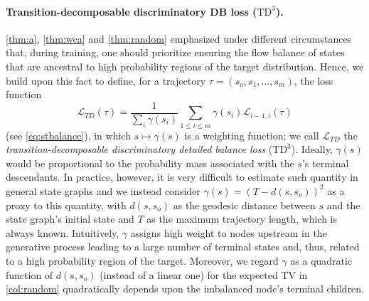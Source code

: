 \documentclass{article}
\theoremstyle{plain}
\theoremstyle{definition}
\theoremstyle{remark}
\theoremstyle{remark}
\begin{document}
\paragraph{Transition-decomposable discriminatory DB loss ($\text{TD}^{3}$).} \autoref{thm:a}, \autoref{thm:wca} and \autoref{thm:random} emphasized under different circumstances that, during training, one should prioritize ensuring the flow balance of states that are ancestral to high probability regions of the target distribution. Hence, we build upon this fact to define, for a trajectory $\tau = (s_{o}, s_{1}, \dots, s_{m})$, the loss function 
\begin{equation*}
    \mathcal{L}_{TD}(\tau) = \frac{1}{\sum_{i} \gamma(s_{i})} \sum_{1 \le i \le m} \gamma(s_{i}) \mathcal{L}_{i - 1, i}(\tau)%
\end{equation*}
(see \autoref{eq:stbalance}), in which $s \mapsto \gamma(s)$ is a weighting function; we call $\mathcal{L}_{TD}$ the \textit{transition-decomposable discriminatory detailed balance loss} ($\text{TD}^{3}$). Ideally, $\gamma(s)$ would be proportional to the probability mass associated with the $s$'s terminal descendants. In practice, however, it is very difficult to estimate such quantity in general state graphs and we instead consider $\gamma(s) = (T - d(s, s_{o}))^{2}$ as a proxy to this quantity, with $d(s, s_{o})$ as the geodesic distance between $s$ and the state graph's initial state and $T$ as the maximum trajectory length, which is always known. Intuitively, $\gamma$ assigns high weight to nodes upstream in the generative process leading to a large number of terminal states and, thus, related to a high probability region of the target. Moreover, we regard $\gamma$ as a quadratic function of $d(s, s_{o})$ (instead of a linear one) for the expected TV in \autoref{col:random} quadratically depends upon the imbalanced node's terminal children.   



\end{document}
